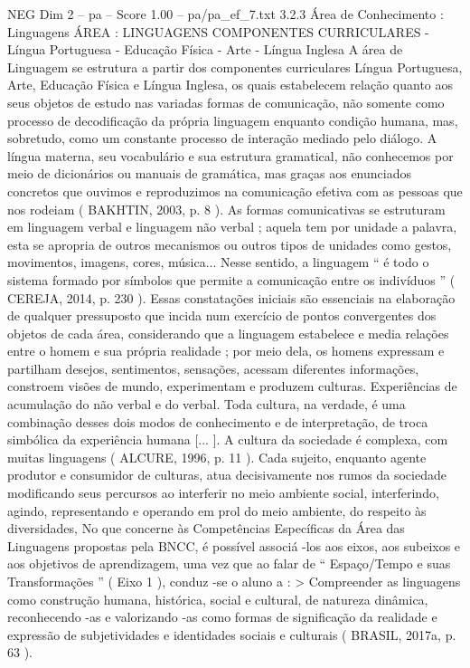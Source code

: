 \begin{textsample}{NEG Dim 2 – pa – Score 1.00 – pa/pa\_ef\_7.txt}  \label{ex:f2_neg_225}
3.2.3 Área de Conhecimento : Linguagens ÁREA : LINGUAGENS COMPONENTES CURRICULARES - Língua Portuguesa - Educação Física - Arte - Língua Inglesa A área de Linguagem se estrutura a partir dos componentes curriculares Língua Portuguesa, Arte, Educação Física e Língua Inglesa, os quais estabelecem relação quanto aos seus objetos de estudo nas variadas formas de comunicação, não somente como processo de decodificação da própria linguagem enquanto condição humana, mas, sobretudo, como um constante processo de interação mediado pelo diálogo.
A língua materna, seu vocabulário e sua estrutura gramatical, não conhecemos por meio de dicionários ou manuais de gramática, mas graças aos enunciados concretos que ouvimos e reproduzimos na comunicação efetiva com as pessoas que nos rodeiam ( BAKHTIN, 2003, p. 8 ).
As formas comunicativas se estruturam em linguagem verbal e linguagem não verbal ; aquela tem por unidade a palavra, esta se apropria de outros mecanismos ou outros tipos de unidades como gestos, movimentos, imagens, cores, música...
Nesse sentido, a linguagem “ é todo o sistema formado por símbolos que permite a comunicação entre os indivíduos ” ( CEREJA, 2014, p. 230 ).
Essas constatações iniciais são essenciais na elaboração de qualquer pressuposto que incida num exercício de pontos convergentes dos objetos de cada área, considerando que a linguagem estabelece e media relações entre o homem e sua própria realidade ; por meio dela, os homens expressam e partilham desejos, sentimentos, sensações, acessam diferentes informações, constroem visões de mundo, experimentam e produzem culturas.
Experiências de acumulação do não verbal e do verbal.
Toda cultura, na verdade, é uma combinação desses dois modos de conhecimento e de interpretação, de troca simbólica da experiência humana [... ].
A cultura da sociedade é complexa, com muitas linguagens ( ALCURE, 1996, p. 11 ).
Cada sujeito, enquanto agente produtor e consumidor de culturas, atua decisivamente nos rumos da sociedade modificando seus percursos ao interferir no meio ambiente social, interferindo, agindo, representando e operando em prol do meio ambiente, do respeito às diversidades, No que concerne às Competências Específicas da Área das Linguagens propostas pela BNCC, é possível associá -los aos eixos, aos subeixos e aos objetivos de aprendizagem, uma vez que ao falar de “ Espaço/Tempo e suas Transformações ” ( Eixo 1 ), conduz -se o aluno a : > Compreender as linguagens como construção humana, histórica, social e cultural, de natureza dinâmica, reconhecendo -as e valorizando -as como formas de significação da realidade e expressão de subjetividades e identidades sociais e culturais ( BRASIL, 2017a, p. 63 ).

\end{textsample}
